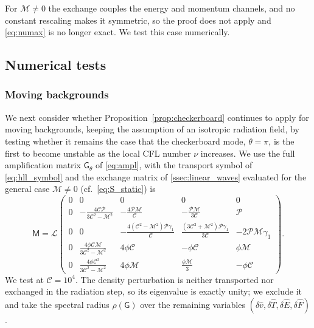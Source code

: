 \documentclass[preprint,12pt,authoryear]{elsarticle}
\newcommand{\tenG}{\mathsf{G}}
\newcommand{\tenM}{\mathsf{M}}
\newcommand{\hE}{\hat{E}}
\newcommand{\hv}{\hat{v}}
\newcommand{\hF}{\hat{F}}
\newcommand{\hT}{\hat{T}}
\newcommand{\calC}{\mathcal{C}}
\newcommand{\calP}{\mathcal{P}}
\newcommand{\calM}{\mathcal{M}}
\newcommand{\calL}{\mathcal{L}}
\begin{document}
\begin{appendix}
For $\calM \neq 0$ the exchange couples the energy and momentum channels, and no constant rescaling makes it symmetric, so the proof does not apply and \autoref{eq:numax} is no longer exact. We test this case numerically.

\subsection{Numerical tests}
\label{app:numerics}

\subsubsection{Moving backgrounds}

We next consider whether Proposition~\ref{prop:checkerboard} continues to apply for moving backgrounds, keeping the assumption of an isotropic radiation field, by testing whether it remains the case that the checkerboard mode, $\theta = \pi$, is the first to become unstable as the local CFL number $\nu$ increases. We use the full amplification matrix $\tenG_\theta$ of \autoref{eq:ampl}, with the transport symbol of \autoref{eq:hll_symbol} and the exchange matrix
of \autoref{ssec:linear_waves} evaluated for the general case $\calM \neq 0$ (cf.~\autoref{eq:S_static}) is
\begin{equation}
\tenM = \calL \left(\begin{array}{ccccc}
0 & 0 & 0 & 0 & 0 \\
0 & -\frac{4\calC \calP}{3\calC^2-\calM^2} & -\frac{4\calP\calM}{\calC} & -\frac{\calP\calM}{3\calC} & \calP \\
0 & 0 & -\frac{4\left(\calC^2-\calM^2\right)\calP\gamma_1}{\calC} & \frac{\left(3\calC^2+\calM^2\right)\calP\gamma_1}{3\calC} & -2\calP\calM\gamma_1 \\
0 & \frac{4\phi \calC\calM}{3\calC^2-\calM^2} & 4\phi\calC & -\phi\calC & \phi\calM \\
0 & \frac{4\phi\calC^2}{3\calC^2-\calM^2} & 4\phi\calM & \frac{\phi\calM}{3} & -\phi\calC
\end{array}\right).
\end{equation}
We test at $\calC = 10^4$. The density perturbation is neither transported nor exchanged in the radiation step, so its eigenvalue is exactly unity; we exclude it and take the spectral radius $\rho(\tenG)$ over the remaining variables $(\delta\hv, \delta\hT, \delta\hE, \delta\hF)$.


\end{appendix}
\end{document}
